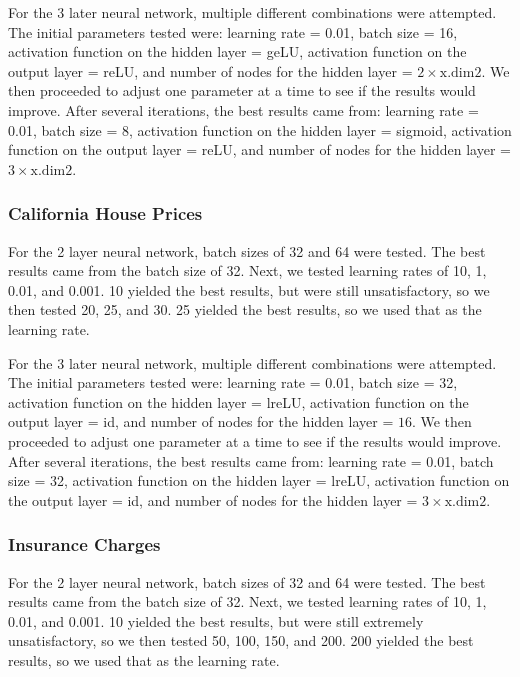 \documentclass{article}
\begin{document}
For the 3 later neural network, multiple different combinations were attempted. The initial parameters tested were: learning rate = 0.01, batch size = 16, activation function on the hidden layer = geLU, activation function on the output layer = reLU, and number of nodes for the hidden layer = $2\times \text{x.dim2}$. We then proceeded to adjust one parameter at a time to see if the results would improve. After several iterations, the best results came from: learning rate = 0.01, batch size = 8, activation function on the hidden layer = sigmoid, activation function on the output layer = reLU, and number of nodes for the hidden layer = $3\times \text{x.dim2}$.

\subsubsection{California House Prices}

For the 2 layer neural network, batch sizes of 32 and 64 were tested. The best results came from the batch size of 32. Next, we tested learning rates of 10, 1, 0.01, and 0.001. 10 yielded the best results, but were still unsatisfactory, so we then tested 20, 25, and 30. 25 yielded the best results, so we used that as the learning rate.

For the 3 later neural network, multiple different combinations were attempted. The initial parameters tested were: learning rate = 0.01, batch size = 32, activation function on the hidden layer = lreLU, activation function on the output layer = id, and number of nodes for the hidden layer = $16$. We then proceeded to adjust one parameter at a time to see if the results would improve. After several iterations, the best results came from: learning rate = 0.01, batch size = 32, activation function on the hidden layer = lreLU, activation function on the output layer = id, and number of nodes for the hidden layer = $3\times \text{x.dim2}$.

\subsubsection{Insurance Charges}

For the 2 layer neural network, batch sizes of 32 and 64 were tested. The best results came from the batch size of 32. Next, we tested learning rates of 10, 1, 0.01, and 0.001. 10 yielded the best results, but were still extremely unsatisfactory, so we then tested 50, 100, 150, and 200. 200 yielded the best results, so we used that as the learning rate.
\end{document}

